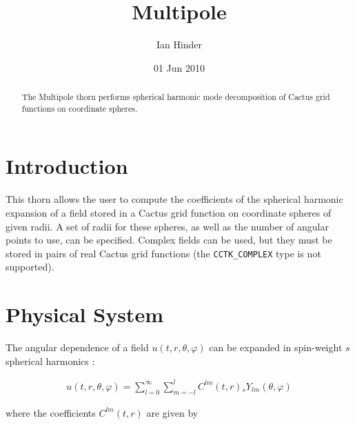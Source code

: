 \documentclass{article}
\begin{document}
\author{Ian Hinder}

\title{Multipole}

\date{01 Jun 2010}

\maketitle



\begin{abstract}
The Multipole thorn performs spherical harmonic mode decomposition
of Cactus grid functions on coordinate spheres.
\end{abstract}


\section{Introduction}
This thorn allows the user to compute the coefficients of the
spherical harmonic expansion of a field stored in a Cactus grid
function on coordinate spheres of given radii.  A set of radii for
these spheres, as well as the number of angular points to use, can be
specified.  Complex fields can be used, but they must be stored in
pairs of real Cactus grid functions (the \verb|CCTK_COMPLEX| type is
not supported).

\section{Physical System}
The angular dependence of a field $u(t, r, \theta, \varphi)$ can be
expanded in spin-weight $s$ spherical harmonics
\cite{Goldberg:1966uu}:

\begin{eqnarray}
  u(t, r, \theta, \varphi) = \sum_{l=0}^\infty \sum_{m=-l}^l C^{lm}(t,r) {}_s Y_{lm}(\theta,\varphi)
\end{eqnarray}

where the coefficients $C^{lm}(t,r)$ are given by
\end{document}
